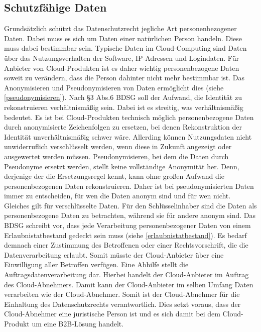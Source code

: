     \subsection{Schutzf\"ahige Daten}
Grunds\"atzlich sch\"utzt das Datenschutzrecht jegliche Art personenbezogener Daten. Dabei muss es sich um Daten einer nat\"urlichen Person handeln. Diese muss dabei bestimmbar sein. Typische Daten im Cloud-Computing sind Daten \"uber das Nutzungsverhalten der Software, IP-Adressen und Logindaten. F\"ur Anbieter von Cloud-Produkten ist es daher wichtig personenbezogene Daten soweit zu ver\"andern, dass die Person dahinter nicht mehr bestimmbar ist. Das Anonymisieren und Pseudonymisieren von Daten erm\"oglicht dies (siehe \vref{pseudonymisieren}). 
Nach §3 Abs.6 BDSG soll der Aufwand, die Identit\"at zu rekonstruieren verh\"altnism\"a{\ss}ig sein. Dabei ist es streitig, was verh\"altnism\"a{\ss}ig bedeutet. Es ist bei Cloud-Produkten technisch m\"oglich personenbezogene Daten durch anonymisierte Zeichenfolgen zu ersetzen, bei denen Rekonstruktion der Identit\"at unverh\"altnism\"a{\ss}ig schwer w\"are. Allerding k\"onnen Nutzungsdaten nicht unwiderruflich verschl\"usselt werden, wenn diese in Zukunft angezeigt oder ausgewertet werden m\"ussen. Pseudonymisieren, bei dem die Daten durch Pseudonyme ersetzt werden, stellt keine vollst\"andige Anonymit\"at her. Denn, derjenige der die Ersetzungsregel kennt, kann ohne gro{\ss}en Aufwand die personenbezogenen Daten rekonstruieren. Daher ist bei pseudonymisierten Daten immer zu entscheiden, f\"ur wen die Daten anonym sind und f\"ur wen nicht. Gleiches gilt f\"ur verschl\"usselte Daten. F\"ur den Schl\"usselinhaber sind die Daten als personenbezogene Daten zu betrachten, w\"ahrend sie f\"ur andere anonym sind.\newline
Das BDSG schreibt vor, dass jede Verarbeitung personenbezogener Daten von einem Erlaubnistatbestand gedeckt sein muss (siehe \vref{erlaubnistatbestand}). Es bedarf demnach einer Zustimmung des Betroffenen oder einer Rechtsvorschrift, die die Datenverarbeitung erlaubt. Somit m\"usste der Cloud-Anbieter \"uber eine Einwilligung aller Betroffen verf\"ugen. Eine Abhilfe stellt die Auftragsdatenverarbeitung dar. Hierbei handelt der Cloud-Anbieter im Auftrag des Cloud-Abnehmers. Damit kann der Cloud-Anbieter im selben Umfang Daten verarbeiten wie der Cloud-Abnehmer. Somit ist der Cloud-Abnehmer f\"ur die Einhaltung des Datenschutzrechts verantwortlich. Dies setzt voraus, dass der Cloud-Abnehmer eine juristische Person ist und es sich damit bei dem Cloud-Produkt um eine B2B-L\"osung handelt.\newline
